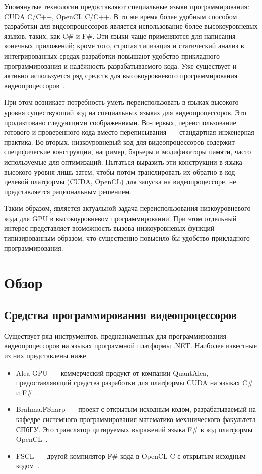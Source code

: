Упомянутые технологии предоставляют специальные языки программирования: CUDA C/C++, OpenCL C/C++. В то же время более удобным способом разработки для видеопроцессоров является использование более высокоуровневых языков, таких, как C\# и F\#. Эти языки чаще применяются для написания конечных приложений; кроме того, строгая типизация и статический анализ в интегрированных средах разработки повышают удобство прикладного программирования и надёжность разрабатываемого кода. Уже существует и активно используется ряд средств для высокоуровневого программирования видеопроцессоров~\cite{Brahma_FSharp, FSCL, AleaGPU}.

При этом возникает потребность уметь переиспользовать в языках высокого уровня существующий код на специальных языках для видеопроцессоров. Это продиктовано следующими соображениями. Во-первых, переиспользование готового и проверенного кода вместо переписывания~--- стандартная инженерная практика. Во-вторых, низкоуровневый код для видеопроцессоров содержит специфические конструкции, например, барьеры и модификаторы памяти, часто используемые для оптимизаций. Пытаться выразить эти конструкции в языка высокого уровня лишь затем, чтобы потом транслировать их обратно в код целевой платформы (CUDA, OpenCL) для запуска на видеопроцессоре, не представляется рациональным решением.

Таким образом, является актуальной задача переиспользования низкоуровневого кода для GPU в высокоуровневом программировании. При этом отдельный интерес представляет возможность вызова низкоуровневых функций типизированным образом, что существенно повысило бы удобство прикладного программирования.

\section{Обзор}

\subsection{Средства программирования видеопроцессоров}
Существует ряд инструментов, предназначенных для программирования видеопроцессоров на языках программной платформы .NET. Наиболее известные из них представлены ниже.
\begin{itemize}
    \item Alea GPU~--- коммерческий продукт от компании QuantAlea, предоставляющий средства разработки для платформы CUDA на языках C\# и F\#~\cite{AleaGPU}.
    \item Brahma.FSharp~--- проект с открытым исходным кодом, разрабатываемый на кафедре системного программирования математико-механического факультета СПбГУ. Это транслятор цитируемых выражений языка F\# в код платформы OpenCL~\cite{Brahma_FSharp}.
    \item FSCL~--- другой компилятор F\#-кода в OpenCL C с открытым исходным кодом~\cite{FSCL}.
\end{itemize}

